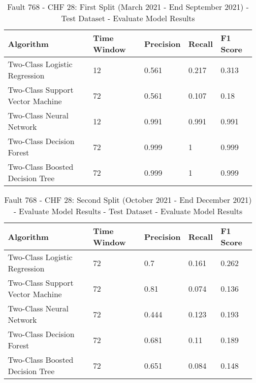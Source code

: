 \begin{table}[!ht]
    \centering
    \begin{tabular}{|l|l|l|l|l|}
    \hline
        Algorithm & Time Window & Precision & Recall & F1 Score \\ \hline
        Two-Class Logistic Regression & 12 & 0.561 & 0.217 & 0.313 \\ \hline
        Two-Class Support Vector Machine & 72 & 0.561 & 0.107 & 0.18 \\ \hline
        Two-Class Neural Network & 12 & 0.991 & 0.991 & 0.991 \\ \hline
        Two-Class Decision Forest & 72 & 0.999 & 1 & 0.999 \\ \hline
        Two-Class Boosted Decision Tree & 72 & 0.999 & 1 & 0.999 \\ \hline
    \end{tabular}
    \caption{Fault 768 - CHF 28: First Split (March 2021 - End September 2021) - Test Dataset - Evaluate Model Results}
    \label{9112_SCA34_1st}
\end{table}

\begin{table}[!ht]
    \centering
    \begin{tabular}{|l|l|l|l|l|}
    \hline
        Algorithm & Time Window & Precision & Recall & F1 Score \\ \hline
        Two-Class Logistic Regression & 72 & 0.7 & 0.161 & 0.262 \\ \hline
        Two-Class Support Vector Machine & 72 & 0.81 & 0.074 & 0.136 \\ \hline
        Two-Class Neural Network & 72 & 0.444 & 0.123 & 0.193 \\ \hline
        Two-Class Decision Forest & 72 & 0.681 & 0.11 & 0.189 \\ \hline
        Two-Class Boosted Decision Tree & 72 & 0.651 & 0.084 & 0.148 \\ \hline
    \end{tabular}
    \caption{Fault 768 - CHF 28: Second Split (October 2021 - End December 2021) - Evaluate Model Results - Test Dataset - Evaluate Model Results}
    \label{9112_SCA34_1st}
\end{table}


